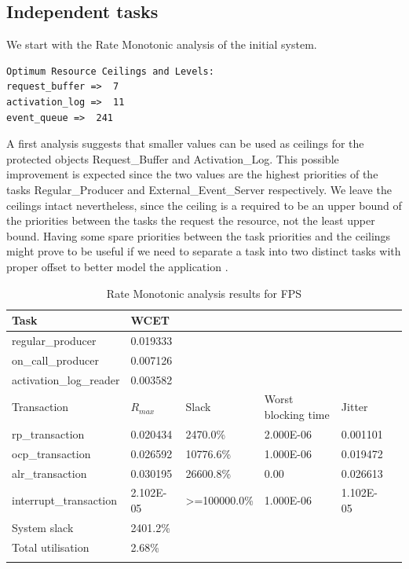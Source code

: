 \documentclass{article}
\begin{document}
\subsection{Independent tasks} \label{independent-tasks}

We start with the Rate Monotonic analysis of the initial system.

\begin{lstlisting}
Optimum Resource Ceilings and Levels:
request_buffer =>  7
activation_log =>  11
event_queue =>  241
\end{lstlisting}

A first analysis suggests that smaller values can be used as ceilings for the protected objects Request\_Buffer and Activation\_Log. This possible improvement is expected since the two values are the highest priorities of the tasks Regular\_Producer and External\_Event\_Server respectively. We leave the ceilings intact nevertheless, since the ceiling is a required to be an upper bound of the priorities between the tasks the request the resource, not the least upper bound. Having some spare priorities between the task priorities and the ceilings might prove to be useful if we need to separate a task into two distinct tasks with proper offset to better model the application \cite{tindell-offsets}.

\begin{longtable}{llllll}
   \toprule
   Task & WCET \\
   \midrule
   regular\_producer & 0.019333 \\
   on\_call\_producer & 0.007126 \\
   activation\_log\_reader & 0.003582 \\
   \toprule
   \toprule
   Transaction & $R_{max}$ & Slack & Worst blocking time & Jitter \\
   \midrule
   rp\_transaction & 0.020434  & 2470.0\% &  2.000E-06 & 0.001101 \\
   ocp\_transaction & 0.026592 & 10776.6\% & 1.000E-06 & 0.019472 \\
   alr\_transaction & 0.030195 & 26600.8\% & 0.00 & 0.026613 \\
   interrupt\_transaction & 2.102E-05 & >=100000.0\% & 1.000E-06 & 1.102E-05 \\
   \toprule
   \toprule
   System slack & 2401.2\% \\
   Total utilisation & 2.68\% \\
   \bottomrule
\caption{Rate Monotonic analysis results for FPS}
\label{tab:rm-fps}
\end{longtable}
\end{document}

